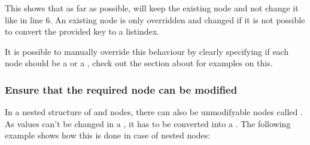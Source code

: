 \documentclass[a4paper,10pt,english]{sphinxmanual}
\begin{document}
\sphinxAtStartPar
This shows that as far as possible,  will keep the existing node and not change it like in line 6. An existing node is only overridden and changed if it is not possible to convert the provided key to a list\sphinxhyphen{}index.

\sphinxAtStartPar
It is possible to manually override this behaviour by clearly specifying if each node should be a   or a  , check out the section about {\hyperref[\detokenize{README:node_types}]{\emph{}}} for examples on this.


\subsubsection{Ensure that the required node can be modified}
\label{\detokenize{README:ensure-that-the-required-node-can-be-modified}}
\sphinxAtStartPar
In a nested structure of \sphinxhyphen{} and \sphinxhyphen{}nodes, there can also be unmodifyable \sphinxhyphen{}nodes called . As values can’t be changed in a , it has to be converted into a . The following example shows how this is done in case of nested \sphinxhyphen{}nodes:

\begin{sphinxVerbatim}[commandchars=\\\{\},numbers=left,firstnumber=1,stepnumber=1]
     \PYG{p}{[}     \PYG{p}{]}
   
\end{sphinxVerbatim}
\end{document}
